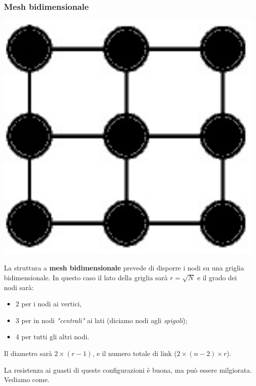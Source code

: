 \documentclass[a4paper,11pt]{article}
\begin{document}
\subsubsection{Mesh bidimensionale}
\begin{center}
	\includegraphics[scale=0.09]{../figures/mesh.png}
\end{center}
La struttura a \textbf{mesh bidimensionale} prevede di disporre i nodi su una griglia bidimensionale.
In questo caso il lato della griglia sarà $r = \sqrt{N}$ e il grado dei nodi sarà:
\begin{itemize}
	\item 2 per i nodi ai vertici,
	\item 3 per in nodi \textit{"centrali"} ai lati (diciamo nodi agli \textit{spigoli});
	\item 4 per tutti gli altri nodi.
\end{itemize}
Il diametro sarà $2 \times (r - 1)$, e il numero totale di link ($2 \times (n - 2) \times r$).

La resistenza ai guasti di queste configurazioni è buona, ma può essere milgiorata. Vediamo come.
\end{document}
